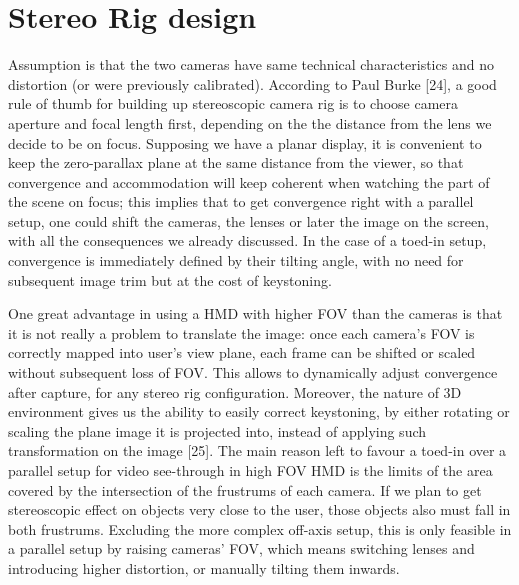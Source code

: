 \section{Stereo Rig design}
Assumption is that the two cameras have same technical characteristics and no distortion (or were previously calibrated). According to Paul Burke [24], a good rule of thumb for building up stereoscopic camera rig is to choose camera aperture and focal length first, depending on the the distance from the lens we decide to be on focus. Supposing we have a planar display, it is convenient to keep the zero-parallax plane at the same distance from the viewer, so that convergence and accommodation will keep coherent when watching the part of the scene on focus; this implies that to get convergence right with a parallel setup, one could shift the cameras, the lenses or later the image on the screen, with all the consequences we already discussed. In the case of a toed-in setup, convergence is immediately defined by their tilting angle, with no need for subsequent image trim but at the cost of keystoning.

One great advantage in using a HMD with higher FOV than the cameras is that it is not really a problem to translate the image: once each camera's FOV is correctly mapped into user's view plane, each frame can be shifted or scaled without subsequent loss of FOV. This allows to dynamically adjust convergence after capture, for any stereo rig configuration. Moreover, the nature of 3D environment gives us the ability to easily correct keystoning, by either rotating or scaling the plane image it is projected into, instead of applying such transformation on the image [25]. The main reason left to favour a toed-in over a parallel setup for video see-through in high FOV HMD is the limits of the area covered by the intersection of the frustrums of each camera. If we plan to get stereoscopic effect on objects very close to the user, those objects also must fall in both frustrums. Excluding the more complex off-axis setup, this is only feasible in a parallel setup by raising cameras' FOV, which means switching lenses and introducing higher distortion, or manually tilting them inwards.

